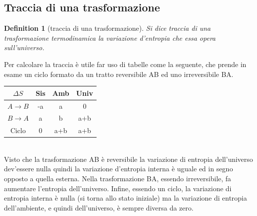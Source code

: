 \documentclass[10pt,a4paper]{article}
\newtheorem{definition}{Definition}
\begin{document}
\subsection{Traccia di una trasformazione}
\begin{definition}[traccia di una trasformazione]
	Si dice traccia di una trasformazione termodinamica la variazione d'entropia che essa opera sull'universo.
\end{definition}
Per calcolare la traccia è utile far uso di tabelle come la seguente, che prende in esame un ciclo formato da un tratto reversibile AB ed uno irreversibile BA. 
\begin{table}[h!]
	\begin{center}
		\begin{tabular}{ || c| c | c| c|| }
			\hline
			\(\Delta S\) & Sis& Amb& Univ\\
			\hline
		\(A\rightarrow B\)& -a   &a  &0  \\
		\(B\rightarrow A\)& a    &b   &a+b\\
		\hline
			Ciclo         & 0    &a+b &a+b \\
			\hline
		\end{tabular}
	\end{center}
\end{table}\\
Visto che la trasformazione AB è reversibile la variazione di entropia dell'universo dev'essere nulla quindi la variazione d'entropia interna è uguale ed in segno opposto a quella esterna. Nella trasformazione BA, essendo irreversibile, fa aumentare l'entropia dell'universo. Infine, essendo un ciclo, la variazione di entropia interna è nulla (si torna allo stato iniziale) ma la variazione di entropia dell'ambiente, e quindi dell'universo, è sempre diversa da zero. 
\end{document}
